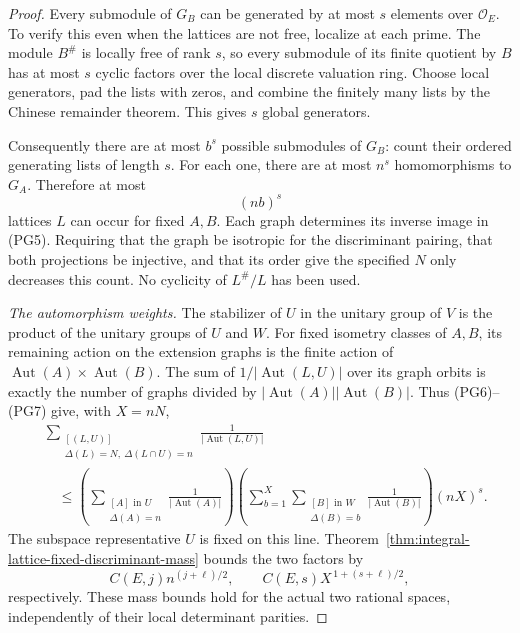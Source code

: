 \begin{proof}
Every submodule of \(G_B\) can be generated by at most \(s\)
elements over \(\mathcal O_E\).  To verify this even when
the lattices are not free, localize at each prime.  The
module \(B^\#\) is locally free of rank \(s\), so every
submodule of its finite quotient by \(B\) has at most
\(s\) cyclic factors over the local discrete valuation
ring.  Choose local generators, pad the lists with zeros,
and combine the finitely many lists by the Chinese remainder
theorem.  This gives \(s\) global generators.

Consequently there are at most \(b^s\) possible submodules
of \(G_B\): count their ordered generating lists of length
\(s\).  For each one, there are at most \(n^s\) homomorphisms
to \(G_A\).  Therefore at most
\[
                            (nb)^s
 \tag{PG7}
\]
lattices \(L\) can occur for fixed \(A,B\).  Each graph
determines its inverse image in (PG5).  Requiring that the
graph be isotropic for the discriminant pairing, that both
projections be injective, and that its order give the
specified \(N\) only decreases this count.  No cyclicity
of \(L^\#/L\) has been used.

\smallskip\noindent\emph{The automorphism weights.}
The stabilizer of \(U\) in the unitary group of \(V\)
is the product of the unitary groups of \(U\) and \(W\).
For fixed isometry classes of \(A,B\), its remaining
action on the extension graphs is the finite action of
\(\operatorname{Aut}(A)\times\operatorname{Aut}(B)\).
The sum of \(1/|\operatorname{Aut}(L,U)|\) over its
graph orbits is exactly the number of graphs divided by
\(|\operatorname{Aut}(A)||\operatorname{Aut}(B)|\).
Thus (PG6)--(PG7) give, with \(X=nN\),
\[
 \begin{split}
 &\sum_{\substack{[(L,U)]\\
                  \Delta(L)=N,\ \Delta(L\cap U)=n}}
               \frac1{|\operatorname{Aut}(L,U)|}\\
 &\quad\leq
 \left(\sum_{\substack{[A]\text{ in }U\\\Delta(A)=n}}
                       \frac1{|\operatorname{Aut}(A)|}\right)
 \left(\sum_{b=1}^{X}
        \sum_{\substack{[B]\text{ in }W\\\Delta(B)=b}}
                       \frac1{|\operatorname{Aut}(B)|}\right)
                           (nX)^s .
 \end{split}
 \tag{PG8}
\]
The subspace representative \(U\) is fixed on this line.
Theorem~\ref{thm:integral-lattice-fixed-discriminant-mass}
bounds the two factors by
\[
 C(E,j)n^{(j+\ell)/2},\qquad
 C(E,s)X^{\,1+(s+\ell)/2},
 \tag{PG9}
\]
respectively.  These mass bounds hold for the actual two
rational spaces, independently of their local determinant
parities.


\end{proof}
